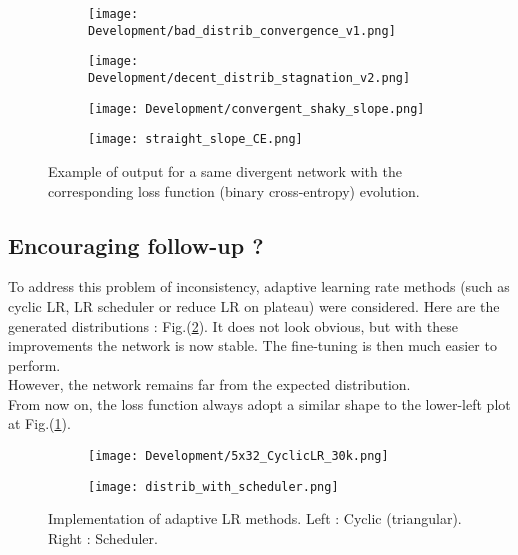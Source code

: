 \begin{figure}[H]
    \centering
    \begin{subfigure}{0.37\textwidth}
        \centering
        \texttt{[image: Development/bad\_distrib\_convergence\_v1.png]}
    \end{subfigure}
    \hspace{1.3cm}
    \begin{subfigure}{0.37\textwidth}
        \centering
        \texttt{[image: Development/decent\_distrib\_stagnation\_v2.png]}
    \end{subfigure}
    \begin{subfigure}{0.37\textwidth}
        \centering
        \texttt{[image: Development/convergent\_shaky\_slope.png]}
    \end{subfigure}
    \hspace{1.15cm}
    \begin{subfigure}{0.37\textwidth}
        \centering
        \texttt{[image: straight\_slope\_CE.png]}
    \end{subfigure}
    \caption{Example of output for a same divergent network with the corresponding loss function (binary cross-entropy) evolution.}
    \label{distrib + lr x2}
\end{figure}

\subsection{Encouraging follow-up ?}
To address this problem of inconsistency, adaptive learning rate methods (such as cyclic LR, LR scheduler or reduce LR on plateau) were considered. Here are the generated distributions : Fig.(\ref{follow up}). It does not look obvious, but with these improvements the network is now stable. The fine-tuning is then much easier to perform.\\
However, the network remains far from the expected distribution.\\
From now on, the loss function always adopt a similar shape to the lower-left plot at Fig.(\ref{distrib + lr x2}).

\begin{figure}[H]
    \centering
    \begin{subfigure}{0.37\textwidth}
        \centering
        \texttt{[image: Development/5x32\_CyclicLR\_30k.png]}
    \end{subfigure}
    \hspace{1.3cm}
    \begin{subfigure}{0.37\textwidth}
        \centering
        \texttt{[image: distrib\_with\_scheduler.png]}
    \end{subfigure}
    \caption{Implementation of adaptive LR methods. Left : Cyclic (triangular). Right : Scheduler.}
    \label{follow up}
\end{figure}

